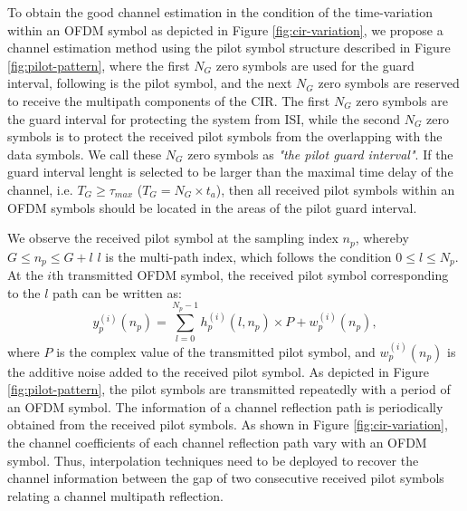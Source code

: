\documentclass[AMA]{WileyNJD-v1}
\begin{document}
To obtain the good channel estimation in the condition of the time-variation within an OFDM symbol as depicted in Figure \ref{fig:cir-variation}, we propose a channel estimation method using the pilot symbol structure described in Figure \ref{fig:pilot-pattern}, where the first $N_G$ zero symbols are used for the guard interval, following is the pilot symbol, and the next $N_G$ zero symbols are reserved to receive the multipath components of the CIR. The  first $N_G$ zero symbols are the guard interval for protecting the system from ISI, while the second  $N_G$ zero symbols is to protect the received pilot symbols from the overlapping with the data symbols. We call these  $N_G$ zero symbols as {\it{"the pilot guard interval"}}. If the guard interval lenght is selected to be larger than the maximal time delay of the channel, i.e. $T_{G} \geqslant \tau_{max}$ (${T_{G}=N_G \times t_a }$), then all received pilot symbols within an OFDM symbols should be located in the areas of the pilot guard interval.


We observe the received pilot symbol at the sampling index $n_p$, whereby $G\leq n_p \leq G + l$ $l$ is the multi-path index, which follows the condition $0\leq l \leq N_p $.  At the $i$th transmitted OFDM symbol, the received pilot symbol corresponding to the $l$ path can be written as:
	\begin{equation}\label{eq:received-pilot-symbol}
	y^{(i)}_{p}(n_p) = \sum_{l = 0}^{N_p - 1} h^{(i)}_{p}(l,n_p) \times P  + w^{(i)}_{p}(n_p),                 
	\end{equation}
where $P$ is the complex value of the transmitted pilot symbol, and $w^{(i)}_{p}(n_p)$ is the additive noise added to the received pilot symbol. As depicted in Figure \ref{fig:pilot-pattern}, the pilot symbols are transmitted repeatedly with a period of an OFDM symbol. The information of a channel reflection path is periodically obtained from the received pilot symbols. As shown in Figure  \ref{fig:cir-variation}, the channel coefficients  of each channel reflection path vary with an OFDM symbol. Thus, interpolation techniques need to be deployed to recover the channel information between the gap of two consecutive received pilot symbols relating a channel multipath reflection. 
\end{document}
